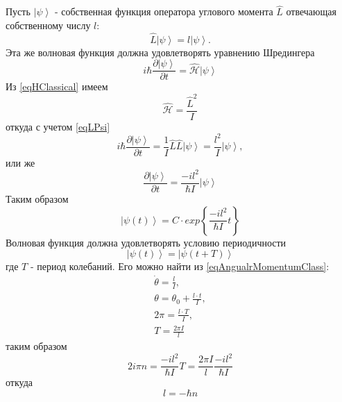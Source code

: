 Пусть $\left|\psi\right>$ - собственная функция оператора углового
момента $\hat{L}$ отвечающая собственному числу $l$:
\begin{equation}
\hat{L} \left|\psi\right> = l \left|\psi\right>.
\label{eqLPsi}
\end{equation}
Эта же волновая функция должна удовлетворять уравнению Шредингера
\[
i \hbar \frac{\partial \left|\psi\right>}{ \partial t} = 
\hat { \mathcal{H} } \left|\psi\right>
\]
Из \eqref{eqHClassical} имеем
\[
\hat { \mathcal{H} } = \frac{\hat{L}^2}{I}
\]
откуда с учетом \eqref{eqLPsi}
\[
i \hbar \frac{\partial \left|\psi\right>}{ \partial t} = 
\frac{1}{I} \hat{L} \hat{L} \left|\psi\right> = 
\frac{l^2}{I} \left|\psi\right>,
\]
или же
\[
\frac{\partial \left|\psi\right>}{ \partial t} = 
\frac{-i l^2}{\hbar I} \left|\psi\right>
\]
Таким образом
\[
\left|\psi\left(t \right)\right> = C \cdot exp\left\{\frac{-i l^2}{\hbar
    I} t
\right\}
\]
Волновая функция должна удовлетворять условию периодичности
\[
\left|\psi\left(t \right) \right>= \left|\psi\left(t + T \right)\right>
\]
где $T$ - период колебаний. Его можно найти из
\eqref{eqAngualrMomentumClass}:
\begin{eqnarray}
\dot{\theta} = \frac{l}{I},
\nonumber \\
\theta = \theta_0 + \frac{l \cdot t}{I},
\nonumber \\
2 \pi = \frac{l \cdot T}{I},
\nonumber \\
T = \frac{2 \pi I}{l}
\nonumber 
\end{eqnarray}
таким образом
\[
2 i \pi n = \frac{-i l^2}{\hbar I} T = 
\frac{2 \pi I}{l} \frac{-i l^2}{\hbar I}
\]
откуда
\[
l = -\hbar n
\]
